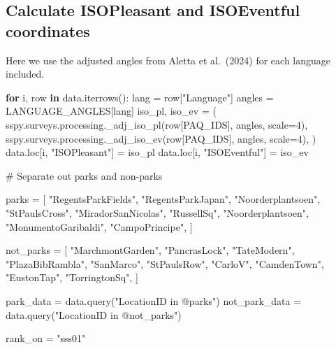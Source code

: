 \documentclass[
  authoryear,
  preprint,
  3p]{elsarticle}
\newenvironment{Shaded}{\begin{snugshade}}{\end{snugshade}}
\newcommand{\CommentTok}[1]{\textcolor[rgb]{0.37,0.37,0.37}{#1}}
\newcommand{\ControlFlowTok}[1]{\textcolor[rgb]{0.00,0.23,0.31}{\textbf{#1}}}
\newcommand{\DecValTok}[1]{\textcolor[rgb]{0.68,0.00,0.00}{#1}}
\newcommand{\KeywordTok}[1]{\textcolor[rgb]{0.00,0.23,0.31}{\textbf{#1}}}
\newcommand{\NormalTok}[1]{\textcolor[rgb]{0.00,0.23,0.31}{#1}}
\newcommand{\OperatorTok}[1]{\textcolor[rgb]{0.37,0.37,0.37}{#1}}
\newcommand{\StringTok}[1]{\textcolor[rgb]{0.13,0.47,0.30}{#1}}
\begin{document}
\subsection{Calculate ISOPleasant and ISOEventful
coordinates}\label{calculate-isopleasant-and-isoeventful-coordinates}

Here we use the adjusted angles from Aletta et al.~(2024) for each
language included.

\begin{Shaded}
\begin{Highlighting}[]
\ControlFlowTok{for}\NormalTok{ i, row }\KeywordTok{in}\NormalTok{ data.iterrows():}
\NormalTok{    lang }\OperatorTok{=}\NormalTok{ row[}\StringTok{"Language"}\NormalTok{]}
\NormalTok{    angles }\OperatorTok{=}\NormalTok{ LANGUAGE\_ANGLES[lang]}
\NormalTok{    iso\_pl, iso\_ev }\OperatorTok{=}\NormalTok{ (}
\NormalTok{        sspy.surveys.processing.\_adj\_iso\_pl(row[PAQ\_IDS], angles, scale}\OperatorTok{=}\DecValTok{4}\NormalTok{),}
\NormalTok{        sspy.surveys.processing.\_adj\_iso\_ev(row[PAQ\_IDS], angles, scale}\OperatorTok{=}\DecValTok{4}\NormalTok{),}
\NormalTok{    )}
\NormalTok{    data.loc[i, }\StringTok{"ISOPleasant"}\NormalTok{] }\OperatorTok{=}\NormalTok{ iso\_pl}
\NormalTok{    data.loc[i, }\StringTok{"ISOEventful"}\NormalTok{] }\OperatorTok{=}\NormalTok{ iso\_ev}
\end{Highlighting}
\end{Shaded}

\begin{Shaded}
\begin{Highlighting}[]
\CommentTok{\# Separate out parks and non{-}parks}

\NormalTok{parks }\OperatorTok{=}\NormalTok{ [}
    \StringTok{"RegentsParkFields"}\NormalTok{,}
    \StringTok{"RegentsParkJapan"}\NormalTok{,}
    \StringTok{"Noorderplantsoen"}\NormalTok{,}
    \StringTok{"StPaulsCross"}\NormalTok{,}
    \StringTok{"MiradorSanNicolas"}\NormalTok{,}
    \StringTok{"RussellSq"}\NormalTok{,}
    \StringTok{"Noorderplantsoen"}\NormalTok{,}
    \StringTok{"MonumentoGaribaldi"}\NormalTok{,}
    \StringTok{"CampoPrincipe"}\NormalTok{,}
\NormalTok{]}

\NormalTok{not\_parks }\OperatorTok{=}\NormalTok{ [}
    \StringTok{"MarchmontGarden"}\NormalTok{,}
    \StringTok{"PancrasLock"}\NormalTok{,}
    \StringTok{"TateModern"}\NormalTok{,}
    \StringTok{"PlazaBibRambla"}\NormalTok{,}
    \StringTok{"SanMarco"}\NormalTok{,}
    \StringTok{"StPaulsRow"}\NormalTok{,}
    \StringTok{"CarloV"}\NormalTok{,}
    \StringTok{"CamdenTown"}\NormalTok{,}
    \StringTok{"EustonTap"}\NormalTok{,}
    \StringTok{"TorringtonSq"}\NormalTok{,}
\NormalTok{]}

\NormalTok{park\_data }\OperatorTok{=}\NormalTok{ data.query(}\StringTok{"LocationID in @parks"}\NormalTok{)}
\NormalTok{not\_park\_data }\OperatorTok{=}\NormalTok{ data.query(}\StringTok{"LocationID in @not\_parks"}\NormalTok{)}

\NormalTok{rank\_on }\OperatorTok{=} \StringTok{"sss01"}
\end{Highlighting}
\end{Shaded}
\end{document}
